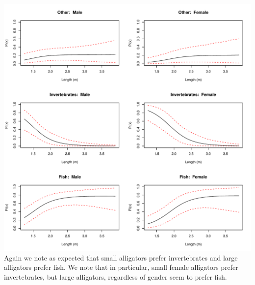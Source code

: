 \documentclass[12pt]{article}
\begin{document}
\begin{enumerate}
\begin{enumerate}[(a)]
	\includegraphics[scale = .7]{plot12.pdf} \\
	Again we note as expected that small alligators prefer invertebrates and large alligators prefer fish. We note that in particular, small female alligators prefer invertebrates, but large alligators, regardless of gender seem to prefer fish. 
	
	
\end{enumerate}



\end{enumerate}
\end{document}
